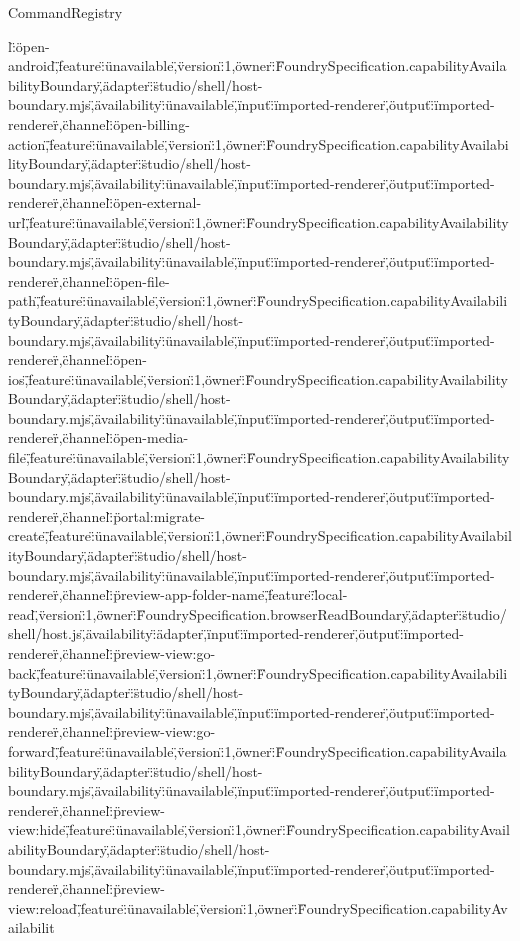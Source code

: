 \begin{lexlean}{CommandRegistry}
\begin{semanticmodule}
{l\":\"open-android\",\"feature\":\"unavailable\",\"version\":1,\"owner\":\"FoundrySpecification.capabilityAvailabilityBoundary\",\"adapter\":\"studio/shell/host-boundary.mjs\",\"availability\":\"unavailable\",\"input\":\"imported-renderer\",\"output\":\"imported-renderer\"},{\"channel\":\"open-billing-action\",\"feature\":\"unavailable\",\"version\":1,\"owner\":\"FoundrySpecification.capabilityAvailabilityBoundary\",\"adapter\":\"studio/shell/host-boundary.mjs\",\"availability\":\"unavailable\",\"input\":\"imported-renderer\",\"output\":\"imported-renderer\"},{\"channel\":\"open-external-url\",\"feature\":\"unavailable\",\"version\":1,\"owner\":\"FoundrySpecification.capabilityAvailabilityBoundary\",\"adapter\":\"studio/shell/host-boundary.mjs\",\"availability\":\"unavailable\",\"input\":\"imported-renderer\",\"output\":\"imported-renderer\"},{\"channel\":\"open-file-path\",\"feature\":\"unavailable\",\"version\":1,\"owner\":\"FoundrySpecification.capabilityAvailabilityBoundary\",\"adapter\":\"studio/shell/host-boundary.mjs\",\"availability\":\"unavailable\",\"input\":\"imported-renderer\",\"output\":\"imported-renderer\"},{\"channel\":\"open-ios\",\"feature\":\"unavailable\",\"version\":1,\"owner\":\"FoundrySpecification.capabilityAvailabilityBoundary\",\"adapter\":\"studio/shell/host-boundary.mjs\",\"availability\":\"unavailable\",\"input\":\"imported-renderer\",\"output\":\"imported-renderer\"},{\"channel\":\"open-media-file\",\"feature\":\"unavailable\",\"version\":1,\"owner\":\"FoundrySpecification.capabilityAvailabilityBoundary\",\"adapter\":\"studio/shell/host-boundary.mjs\",\"availability\":\"unavailable\",\"input\":\"imported-renderer\",\"output\":\"imported-renderer\"},{\"channel\":\"portal:migrate-create\",\"feature\":\"unavailable\",\"version\":1,\"owner\":\"FoundrySpecification.capabilityAvailabilityBoundary\",\"adapter\":\"studio/shell/host-boundary.mjs\",\"availability\":\"unavailable\",\"input\":\"imported-renderer\",\"output\":\"imported-renderer\"},{\"channel\":\"preview-app-folder-name\",\"feature\":\"local-read\",\"version\":1,\"owner\":\"FoundrySpecification.browserReadBoundary\",\"adapter\":\"studio/shell/host.js\",\"availability\":\"adapter\",\"input\":\"imported-renderer\",\"output\":\"imported-renderer\"},{\"channel\":\"preview-view:go-back\",\"feature\":\"unavailable\",\"version\":1,\"owner\":\"FoundrySpecification.capabilityAvailabilityBoundary\",\"adapter\":\"studio/shell/host-boundary.mjs\",\"availability\":\"unavailable\",\"input\":\"imported-renderer\",\"output\":\"imported-renderer\"},{\"channel\":\"preview-view:go-forward\",\"feature\":\"unavailable\",\"version\":1,\"owner\":\"FoundrySpecification.capabilityAvailabilityBoundary\",\"adapter\":\"studio/shell/host-boundary.mjs\",\"availability\":\"unavailable\",\"input\":\"imported-renderer\",\"output\":\"imported-renderer\"},{\"channel\":\"preview-view:hide\",\"feature\":\"unavailable\",\"version\":1,\"owner\":\"FoundrySpecification.capabilityAvailabilityBoundary\",\"adapter\":\"studio/shell/host-boundary.mjs\",\"availability\":\"unavailable\",\"input\":\"imported-renderer\",\"output\":\"imported-renderer\"},{\"channel\":\"preview-view:reload\",\"feature\":\"unavailable\",\"version\":1,\"owner\":\"FoundrySpecification.capabilityAvailabilit}
\end{semanticmodule}
\end{lexlean}
